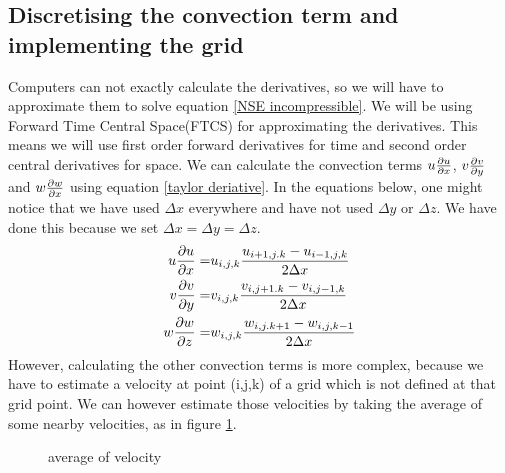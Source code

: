 \documentclass{article}
\begin{document}
\subsection{Discretising the convection term and implementing the grid}
Computers can not exactly calculate the derivatives, so we will have to approximate them to solve equation \ref{NSE incompressible}. We will be using Forward Time Central Space(FTCS) for approximating the derivatives\cite{MAC}. This means we will use first order forward derivatives for time and second order central derivatives for space. We can calculate the convection terms \(u\pdv{u}{x}\), \(v\pdv{v}{y}\) and \(w\pdv{w}{x}\)  using equation \ref{taylor deriative}. In the equations below, one might notice that we have used \(\Delta x\) everywhere and have not used \(\Delta y\) or \(\Delta z\). We have done this because we set \(\Delta x = \Delta y = \Delta z\).
\[\begin{split}
  u\pdv{u}{x}=& u_{i,j,k}\frac{u_{i+1,j.k}-u_{i-1,j,k}}{2\Delta x}\\
  v\pdv{v}{y}=& v_{i,j,k}\frac{v_{i,j+1.k}-v_{i,j-1,k}}{2\Delta x}\\
  w\pdv{w}{z}=& w_{i,j,k}\frac{w_{i,j.k+1}-w_{i,j,k-1}}{2\Delta x}
\end{split}\]
However, calculating the other convection terms is more complex, because we have to estimate a velocity at point (i,j,k) of a grid which is not defined at that grid point. We can however estimate those velocities by taking the average of some nearby velocities, as in figure \ref{velocity to other grid}\cite{MAC}.
\begin{figure}[h]
\centering

\caption{average of velocity} \label{velocity to other grid}
\end{figure}
\end{document}
